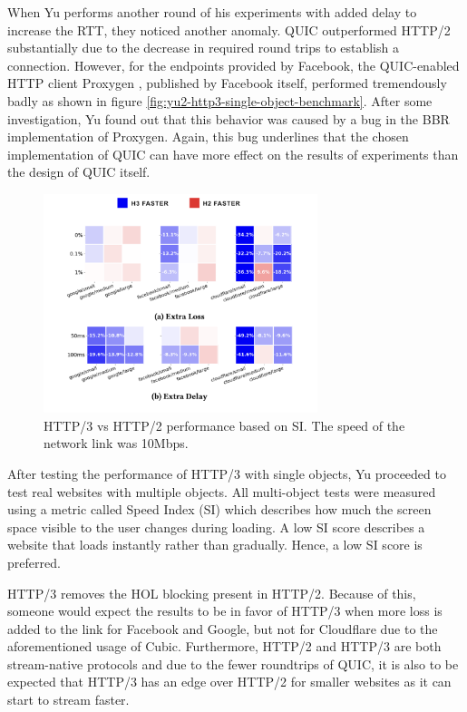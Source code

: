 \documentclass[conference]{IEEEtran}
\begin{document}
When Yu performs another round of his experiments with added delay to increase the RTT, they noticed another anomaly. QUIC outperformed HTTP/2 substantially due to the decrease in required round trips to establish a connection. However, for the endpoints provided by Facebook, the QUIC-enabled HTTP client Proxygen \cite{Proxygen}, published by Facebook itself, performed tremendously badly as shown in figure \ref{fig:yu2-http3-single-object-benchmark}. After some investigation, Yu found out that this behavior was caused by a bug in the BBR implementation of Proxygen. Again, this bug underlines that the chosen implementation of QUIC can have more effect on the results of experiments than the design of QUIC itself.

\begin{figure}[htbp]
\includegraphics[width=8cm,keepaspectratio]{images/Yu2/HTTP3 Multiple objects benchmark.png}
\caption{HTTP/3 vs HTTP/2 performance based on SI. The speed of the network link was 10Mbps.}
\label{fig:yu2-http3-multiple-object-benchmark}
\end{figure}

After testing the performance of HTTP/3 with single objects, Yu proceeded to test real websites with multiple objects. All multi-object tests were measured using a metric called Speed Index (SI) which describes how much the screen space visible to the user changes during loading. A low SI score describes a website that loads instantly rather than gradually. Hence, a low SI score is preferred.

HTTP/3 removes the HOL blocking present in HTTP/2. Because of this, someone would expect the results to be in favor of HTTP/3 when more loss is added to the link for Facebook and Google, but not for Cloudflare due to the aforementioned usage of Cubic. Furthermore, HTTP/2 and HTTP/3 are both stream-native protocols and due to the fewer roundtrips of QUIC, it is also to be expected that HTTP/3 has an edge over HTTP/2 for smaller websites as it can start to stream faster.
\end{document}
